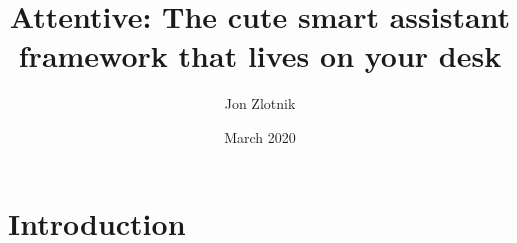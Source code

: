 \documentclass{article}
\title{Attentive: The cute smart assistant framework that lives on your desk}
\author{Jon Zlotnik}
\date{March 2020}
\begin{document}
\maketitle

\section{Introduction}
\end{document}
